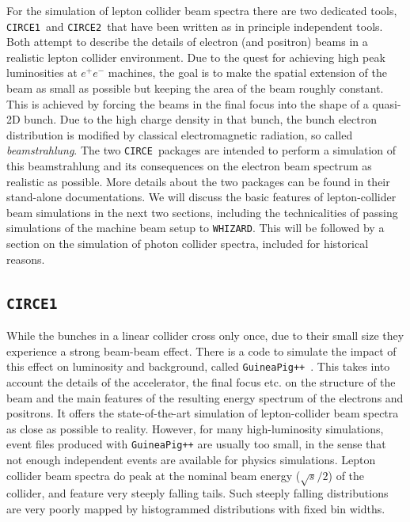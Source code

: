 \documentclass[12pt]{book}
\newcommand{\ttt}[1]{\texttt{#1}}
\newcommand{\whizard}{\ttt{WHIZARD}}
\newcommand{\circe}{\ttt{CIRCE}}
\newcommand{\circeone}{\ttt{CIRCE1}}
\newcommand{\circetwo}{\ttt{CIRCE2}}
\begin{document}
For the simulation of lepton collider beam spectra there are two
dedicated tools, \circeone\ and \circetwo\ that have been written as
in principle independent tools. Both attempt to describe the
details of electron (and positron) beams in a realistic lepton
collider environment. Due to the quest for achieving high peak
luminosities at $e^+e^-$ machines, the goal is to make the spatial
extension of the beam as small as possible but keeping the area of the
beam roughly constant. This is achieved by forcing the beams in the
final focus into the shape of a quasi-2D bunch. Due to the high charge
density in that bunch, the bunch electron distribution is modified by
classical electromagnetic radiation, so called {\em beamstrahlung}.
The two \circe\ packages are intended to perform a simulation of this
beamstrahlung and its consequences on the electron beam spectrum as
realistic as possible. More details about the two packages can be
found in their stand-alone documentations. We will discuss the basic
features of lepton-collider beam simulations in the next two sections,
including the technicalities of passing simulations of the machine
beam setup to \whizard. This will be followed by a section on the
simulation of photon collider spectra, included for historical
reasons.


\subsection{\circeone}

While the bunches in a linear collider cross only once, due to their
small size they experience a strong beam-beam effect. There is a
code to simulate the impact of this effect on luminosity and
background, called
\ttt{GuineaPig++}~\cite{Schulte:1998au,Schulte:1999tx,Schulte:2007zz}.
This takes into account the details of the accelerator, the final
focus etc. on the structure of the beam and the main features of the
resulting energy spectrum of the electrons and positrons. It offers
the state-of-the-art simulation of lepton-collider beam spectra as
close as possible to reality. However, for many high-luminosity
simulations, event files produced with \ttt{GuineaPig++} are usually
too small, in the sense that not enough independent events are
available for physics simulations. Lepton collider beam spectra do
peak at the nominal beam energy ($\sqrt{s}/2$) of the collider, and
feature very steeply falling tails. Such steeply falling distributions
are very poorly mapped by histogrammed distributions with fixed bin
widths.
\end{document}
